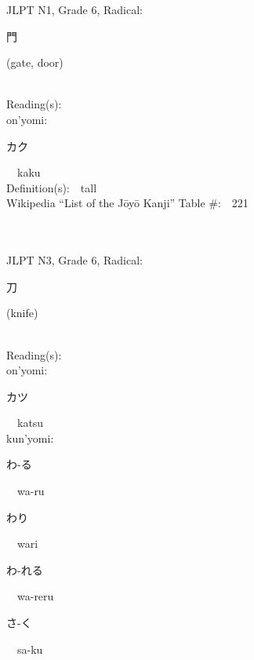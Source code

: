 \begin{multicols}{2}
{JLPT N1, Grade 6, Radical:\ \ {\begin{CJK}{UTF8}{min} 門 \end{CJK}} (gate, door) } \\
Reading(s):\ \ \\
{\hspace*{1em}}on'yomi:\ \ \\
{\hspace*{2em}}{\begin{CJK}{UTF8}{min} カク \end{CJK}}\ \ kaku\ \ \\
Definition(s):\ \ tall \\
Wikipedia ``List of the J\=oy\=o Kanji'' Table \#:\ \ 221 \\
\ \ \\
{\fontsize{34pt}{40pt}  }\ \ \\  %
{JLPT N3, Grade 6, Radical:\ \ {\begin{CJK}{UTF8}{min} 刀 \end{CJK}} (knife) } \\
Reading(s):\ \ \\
{\hspace*{1em}}on'yomi:\ \ \\
{\hspace*{2em}}{\begin{CJK}{UTF8}{min} カツ \end{CJK}}\ \ katsu\ \ \\
{\hspace*{1em}}kun'yomi:\ \ \\
{\hspace*{2em}}{\begin{CJK}{UTF8}{min} わ-る \end{CJK}}\ \ wa-ru\ \ \\
{\hspace*{2em}}{\begin{CJK}{UTF8}{min} わり \end{CJK}}\ \ wari\ \ \\
{\hspace*{2em}}{\begin{CJK}{UTF8}{min} わ-れる \end{CJK}}\ \ wa-reru\ \ \\
{\hspace*{2em}}{\begin{CJK}{UTF8}{min} さ-く \end{CJK}}\ \ sa-ku\ \ \\

\end{multicols}
